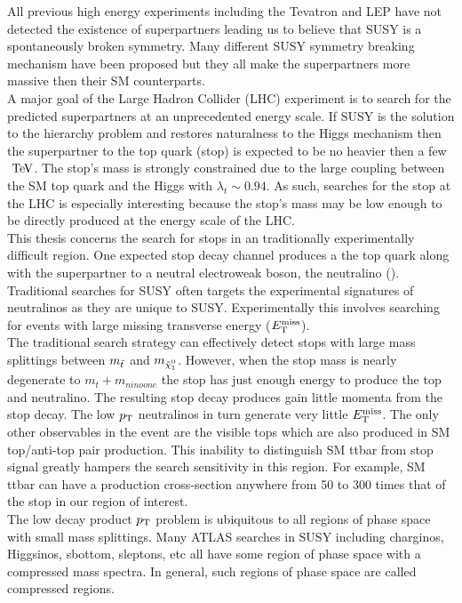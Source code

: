 \indent All previous high energy experiments including the Tevatron and LEP have not detected the existence of superpartners leading us to believe that SUSY is a spontaneously broken symmetry.  Many different SUSY symmetry breaking mechanism have been proposed but they all make the superpartners more massive then their SM counterparts. \\

\indent A major goal of the Large Hadron Collider (LHC) experiment is to search for the predicted superpartners at an unprecedented energy scale.  If SUSY is the solution to the hierarchy problem and restores naturalness to the Higgs mechanism then the superpartner to the top quark (stop) is expected to be no heavier then a few $\tev$.  The stop's mass is strongly constrained due to the large coupling between the SM top quark and the Higgs with $\lambda_t \sim 0.94$.  As such, searches for the stop at the LHC is especially interesting because the stop's mass may be low enough to be directly produced at the energy scale of the LHC. \\

\indent This thesis concerns the search for stops in an traditionally experimentally difficult region.  One expected stop decay channel produces a the top quark along with the superpartner to a neutral electroweak boson, the neutralino (\ninoone). Traditional searches for SUSY often targets the experimental signatures of neutralinos as they are unique to SUSY.  Experimentally this involves searching for events with large missing transverse energy ($E_{\mathrm{T}}^{\mathrm{miss}}$).  \\

\indent The traditional search strategy can effectively detect stops with large mass splittings between $m_{\tilde{t}}$ and $m_{\ninoone}$.  However, when the stop mass is nearly degenerate to $m_t + m_{ninoone}$ the stop has just enough energy to produce the top and neutralino.  The resulting stop decay produces gain little momenta from the stop decay. The low $p_{\mathrm{T}}$ neutralinos in turn generate very little $E_{\mathrm{T}}^{\mathrm{miss}}$. The only other observables in the event are the visible tops which are also produced in SM top/anti-top pair production.  This inability to distinguish SM ttbar from stop signal greatly hampers the search sensitivity in this region.  For example, SM ttbar can have a production cross-section anywhere from 50 to 300 times that of the stop in our region of interest. \\

\indent The low decay product $p_{\mathrm{T}}$ problem is ubiquitous to all regions of phase space with small mass splittings.  Many ATLAS searches in SUSY including charginos, Higgsinos, sbottom, sleptons, etc all have some region of phase space with a compressed mass spectra.  In general, such regions of phase space are called compressed regions. \\

